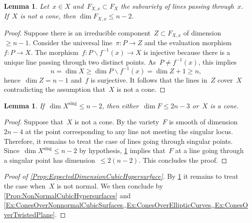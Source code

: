 \documentclass[a4paper]{amsart}
\newcommand{\sing}{{\mathrm{sing}}}
\renewcommand{\le}{\leqslant}
\renewcommand{\ge}{\geqslant}
\theoremstyle{plain}
\newtheorem{lemma}[theorem]{Lemma}
\theoremstyle{definition}
\numberwithin{equation}{section}
\begin{document}
\begin{lemma} \label{lemma:DimensionFanoOfLinesThroughAFixedPoint} Let~$x \in X$ and~$F_{X, x} \subset F_X$ the subvariety of lines passing through~$x$. If~$X$ is not a cone, then
$ \dim F_{X, x} \le n-2$.
\end{lemma}

\begin{proof} Suppose there is an irreducible component~$Z \subset F_{X, x}$ of dimension~$\ge n-1$. Consider the universal line~$\pi \colon P \to Z$ and the evaluation morphism~$f \colon P \to X$. The morphism~$f \colon P\smallsetminus f^{-1}(x) \to X$ is injective because there is a unique line passing through two distinct points. As~$P \neq f^{-1}(x)$, this implies
\[ n = \dim X \ge \dim P\smallsetminus f^{-1}(x) = \dim Z + 1 \ge n,\]
hence~$\dim Z = n-1$ and~$f$ is surjective. It follows that the lines in~$Z$ cover~$X$ contradicting the assumption that~$X$ is not a cone.
\end{proof}

\begin{lemma}\label{lemma dim ysing at most one}
If~$\dim X^\sing\le n-2$, then either~$\dim F \le 2n - 3$ or~$X$ is a cone.
\end{lemma}

\begin{proof} Suppose that~$X$ is not a cone. By \cite[th.~4.2]{AltmanKleiman} the variety~$F$ is smooth of dimension~$2n - 4$ at the point corresponding to any line not meeting the singular locus. Therefore, it remains to treat the case of lines going through singular points. Since~$\dim X^\sing\le n-2$ by hypothesis, \cref{lemma:DimensionFanoOfLinesThroughAFixedPoint} implies that~$F$ at a line going through a singular point has dimension~$\le 2(n-2)$. This concludes the proof. 
\end{proof}

\begin{proof}[{Proof of \cref{Prop:ExpectedDimensionCubicHypersurface}}] By \cref{lemma dim ysing at most one} it remains to treat the case when~$X$ is not normal. We then conclude by \cref{Prop:NonNormalCubicHypersurfaces} and \cref{Ex:ConesOverNonnormalCubicSurfaces,,Ex:ConesOverEllipticCurves,,Ex:ConesOverTwistedPlane}.
\end{proof}
\end{document}
